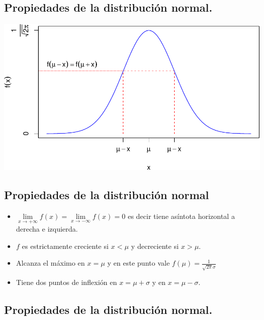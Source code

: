 \documentclass[]{book}
\providecommand{\tightlist}{%
  \setlength{\itemsep}{0pt}\setlength{\parskip}{0pt}}
\begin{document}
\hypertarget{propiedades-de-la-distribuciuxf3n-normal.-1}{%
\subsection{Propiedades de la distribución normal.}\label{propiedades-de-la-distribuciuxf3n-normal.-1}}

\begin{center}\includegraphics{curso-probabilidad-udemy_files/figure-latex/unnamed-chunk-95-1} \end{center}

\hypertarget{propiedades-de-la-distribuciuxf3n-normal}{%
\subsection{Propiedades de la distribución normal}\label{propiedades-de-la-distribuciuxf3n-normal}}

\begin{itemize}
\tightlist
\item
  \(\lim\limits_{x\to+\infty}f(x)=\lim\limits_{x\to-\infty}f(x)=0\) es decir tiene asíntota horizontal a derecha e izquierda.
\item
  \(f\) es estrictamente creciente si \(x<\mu\) y decreciente si \(x>\mu\).
\item
  Alcanza el máximo en \(x=\mu\) y en este punto vale \(f(\mu)=\frac1{\sqrt{2\pi}\sigma}\)
\item
  Tiene dos puntos de inflexión en \(x=\mu+\sigma\) y en \(x=\mu-\sigma\).
\end{itemize}

\hypertarget{propiedades-de-la-distribuciuxf3n-normal.-2}{%
\subsection{Propiedades de la distribución normal.}\label{propiedades-de-la-distribuciuxf3n-normal.-2}}
\end{document}
